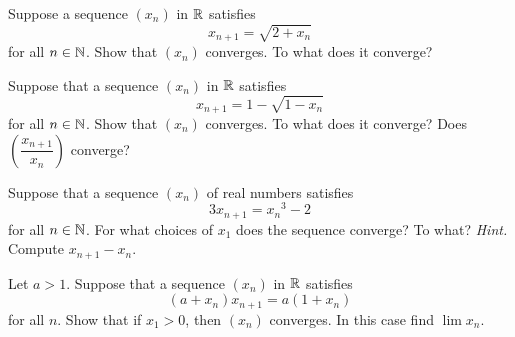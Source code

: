 \begin{prob} Suppose a sequence $(x_n)$ in $\mathbb{R}$ satisfies
   \[ x_{n+1} = \sqrt{2 + x_n} \]
for all $n \in \mathbb{N}$. Show that $(x_n)$ converges. To what does it
converge?
\end{prob}

\begin{prob} Suppose that a sequence $(x_n)$ in $\mathbb{R}$ satisfies
    \[ x_{n+1} = 1 - \sqrt{1 - x_n} \]
for all $n \in \mathbb{N}$.  Show that $(x_n)$ converges. To what does it converge?  Does
$\left(\dfrac{x_{n+1}}{x_n}\right)$ converge?
\end{prob}

\begin{prob} Suppose that a sequence $(x_n)$ of real numbers satisfies
    \[ 3x_{n+1} = {x_n}^3 - 2 \]
for all $n \in \mathbb{N}$. For what choices of $x_1$  does the sequence converge?  To what?
\emph{Hint.}  Compute $x_{n+1} - x_n$.
\end{prob}

\begin{prob} Let $a > 1$. Suppose that a sequence $(x_n)$ in $\mathbb{R}$ satisfies
   \[ (a + x_n)x_{n+1} = a(1 + x_n) \]
for all $n$.  Show that if $x_1 > 0$, then $(x_n)$ converges. In this case find $\lim x_n$.
\end{prob}




\endinput
